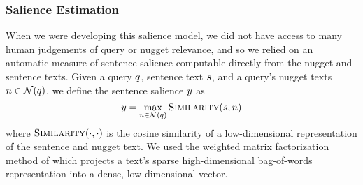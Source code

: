 







  \subsubsection{Salience Estimation}

  















  When we were developing this salience 
  model,
  we did not have access to many human judgements of query or nugget relevance,
  and so we relied on an automatic measure of sentence salience computable
 directly from the nugget and sentence texts.
Given a query $q$, sentence text $s$, and a query's nugget texts 
$n \in \mathcal{N}(q)$, we define
the sentence salience $y$ as
\[ 
  y = \max_{n\in \mathcal{N}(q)} \textsc{Similarity}(s, n)
\]
where $\textsc{Similarity}(\cdot, \cdot)$ is the cosine similarity of a
low-dimensional representation of the sentence and nugget text.
We used the weighted matrix factorization method of \cite{guo2012simple}
which projects a text's sparse high-dimensional bag-of-words representation
into a dense, low-dimensional vector. 



